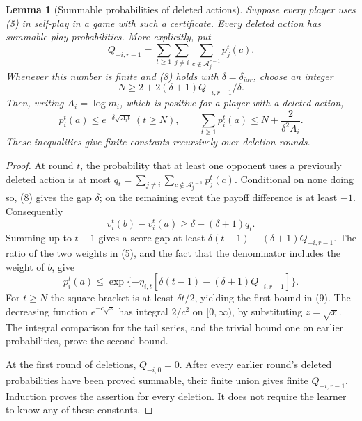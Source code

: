 \documentclass[11pt]{article}
\newtheorem{lemma}{Lemma}
\theoremstyle{definition}
\theoremstyle{remark}
\begin{document}
\begin{lemma}[Summable probabilities of deleted actions]\label{lem:delete}
Suppose every player uses (5) in self-play in a game with such a
certificate. Every deleted action has summable play probabilities.
More explicitly, put
\[
 Q_{-i,r-1}=\sum_{t\geq1}\sum_{j\ne i}
       \sum_{c\notin\mathcal A_j^{r-1}}p_j^t(c).
\]
Whenever this number is finite and (8) holds with $\delta=\delta_{iar}$,
choose an integer
\[
 N\geq2+2(\delta+1)Q_{-i,r-1}/\delta.
\]
Then, writing $A_i=\log m_i$, which is positive for a player with a deleted
action,
\[
 p_i^t(a)\leq e^{-\delta\sqrt{A_i t}}\ (t\geq N),
 \qquad
 \sum_{t\geq1}p_i^t(a)\leq N+\frac{2}{\delta^2 A_i}.  \tag{9}
\]
These inequalities give finite constants recursively over deletion rounds.
\end{lemma}
\begin{proof}
At round $t$, the probability that at least one opponent uses a previously
deleted action is at most
$q_t=\sum_{j\ne i}\sum_{c\notin\mathcal A_j^{r-1}}p_j^t(c)$.
Conditional on none doing so, (8) gives the gap $\delta$; on the remaining
event the payoff difference is at least $-1$. Consequently
\[
 v_i^t(b)-v_i^t(a)\geq\delta-(\delta+1)q_t.
\]
Summing up to $t-1$ gives a score gap at least
$\delta(t-1)-(\delta+1)Q_{-i,r-1}$. The ratio of the two weights in
(5), and the fact that the denominator includes the weight of $b$, give
\[
 p_i^t(a)\leq
 \exp\{-\eta_{i,t}[\delta(t-1)-(\delta+1)Q_{-i,r-1}]\}.
\]
For $t\geq N$ the square bracket is at least $\delta t/2$, yielding
the first bound in (9). The decreasing function $e^{-c\sqrt x}$ has
integral $2/c^2$ on $[0,\infty)$, by substituting $z=\sqrt x$.
The integral comparison for the tail series, and the trivial bound one
on earlier probabilities, prove the second bound.

At the first round of deletions, $Q_{-i,0}=0$. After every earlier round's
deleted probabilities have been proved summable, their finite union gives
finite $Q_{-i,r-1}$. Induction proves the assertion for every deletion.
It does not require the learner to know any of these constants.
\end{proof}
\end{document}
